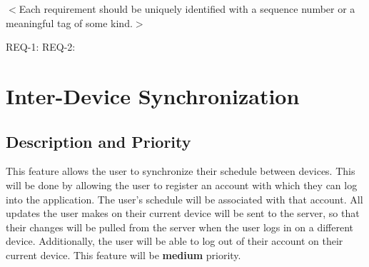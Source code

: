 \documentclass{scrreprt}
\begin{document}
$<$Each requirement should be uniquely identified with a sequence number or a 
meaningful tag of some kind.$>$

REQ-1:	REQ-2:

\section{Inter-Device Synchronization}

\subsection{Description and Priority}
This feature allows the user to synchronize their schedule between devices. 
This will be done by allowing the user to register an account with which they
can log into the application. The user's schedule will be associated with that
account. All updates the user makes on their current device will be sent to the
server, so that their changes will be pulled from the server when the user logs 
in on a different device. Additionally, the user will be able to log out of 
their account on their current device. This feature will be \textbf{medium} priority.
\end{document}
